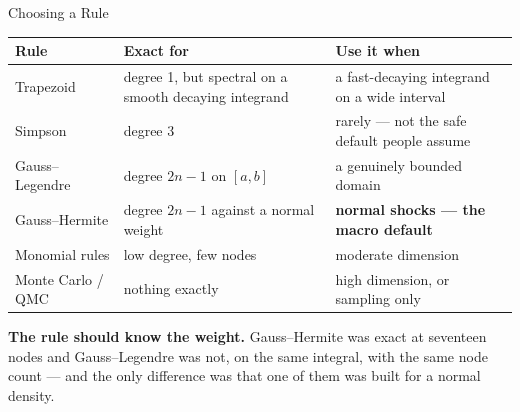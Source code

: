 \begin{frame}{Choosing a Rule}
\renewcommand{\arraystretch}{1.12}
\begin{center}\scriptsize
\begin{tabularx}{\linewidth}{@{}>{\raggedright\arraybackslash}p{3.0cm} >{\raggedright\arraybackslash}X >{\raggedright\arraybackslash}p{3.4cm}@{}}
\toprule
\textbf{Rule} & \textbf{Exact for} & \textbf{Use it when} \\
\midrule
Trapezoid & degree 1, but spectral on a smooth decaying integrand & a fast-decaying integrand on a wide interval \\
Simpson & degree 3 & rarely --- not the safe default people assume \\
Gauss--Legendre & degree $2n-1$ on $[a,b]$ & a genuinely bounded domain \\
Gauss--Hermite & degree $2n-1$ against a normal weight & \textbf{normal shocks --- the macro default} \\
Monomial rules & low degree, few nodes & moderate dimension \\
Monte Carlo / QMC & nothing exactly & high dimension, or sampling only \\
\bottomrule
\end{tabularx}
\end{center}
\vspace{1mm}
\begin{conceptbox}\small
\textbf{The rule should know the weight.} Gauss--Hermite was exact at seventeen nodes and Gauss--Legendre was not, on the same integral, with the same node count --- and the only difference was that one of them was built for a normal density.
\end{conceptbox}
\end{frame}

